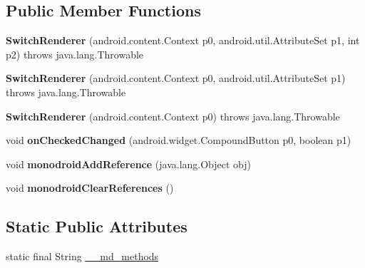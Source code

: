 \subsection*{Public Member Functions}
\begin{DoxyCompactItemize}
\item 
\mbox{\label{classmd5270abb39e60627f0f200893b490a1ade_1_1SwitchRenderer_a28d4f09146c66b0991594aa4e5b0f7ff}} 
{\bfseries Switch\+Renderer} (android.\+content.\+Context p0, android.\+util.\+Attribute\+Set p1, int p2)  throws java.\+lang.\+Throwable 	
\item 
\mbox{\label{classmd5270abb39e60627f0f200893b490a1ade_1_1SwitchRenderer_a2dc3f9d51a00b56ed319cbf9b5dab267}} 
{\bfseries Switch\+Renderer} (android.\+content.\+Context p0, android.\+util.\+Attribute\+Set p1)  throws java.\+lang.\+Throwable 	
\item 
\mbox{\label{classmd5270abb39e60627f0f200893b490a1ade_1_1SwitchRenderer_aea0207fcf836b5f128c00a9bfabce2cb}} 
{\bfseries Switch\+Renderer} (android.\+content.\+Context p0)  throws java.\+lang.\+Throwable 	
\item 
\mbox{\label{classmd5270abb39e60627f0f200893b490a1ade_1_1SwitchRenderer_aef153bafa3b4b8c95620b6c59d403578}} 
void {\bfseries on\+Checked\+Changed} (android.\+widget.\+Compound\+Button p0, boolean p1)
\item 
\mbox{\label{classmd5270abb39e60627f0f200893b490a1ade_1_1SwitchRenderer_a363c621199304e433d9aec4e62dfb8fa}} 
void {\bfseries monodroid\+Add\+Reference} (java.\+lang.\+Object obj)
\item 
\mbox{\label{classmd5270abb39e60627f0f200893b490a1ade_1_1SwitchRenderer_a269d9c853effc1c0864414f6ee8130f3}} 
void {\bfseries monodroid\+Clear\+References} ()
\end{DoxyCompactItemize}
\subsection*{Static Public Attributes}
\begin{DoxyCompactItemize}
\item 
static final String \hyperlink{classmd5270abb39e60627f0f200893b490a1ade_1_1SwitchRenderer_a70baf7daa85c86b196cc9c27e5478a8c}{\+\_\+\+\_\+md\+\_\+methods}
\end{DoxyCompactItemize}
